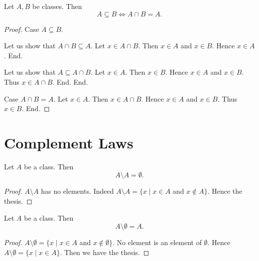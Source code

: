 \documentclass[10pt]{article}
\begin{document}
  \begin{forthel}
    \begin{proposition}
      Let $A, B$ be classes.
      Then \[ A \subseteq B \iff A \cap B = A. \]
    \end{proposition}
    \begin{proof}
      Case $A \subseteq B$.

        Let us show that $A \cap B \subseteq A$.
          Let $x \in A \cap B$.
          Then $x \in A$ and $x \in B$.
          Hence $x \in A$.
        End.

        Let us show that $A \subseteq A \cap B$.
          Let $x \in A$.
          Then $x \in B$.
          Hence $x \in A$ and $x \in B$.
          Thus $x \in A \cap B$.
        End.
      End.

      Case $A \cap B = A$.
        Let $x \in A$.
        Then $x \in A \cap B$.
        Hence $x \in A$ and $x \in B$.
        Thus $x \in B$.
      End.
    \end{proof}
  \end{forthel}


  \section{Complement Laws}

  \begin{forthel}
    \begin{proposition}
      Let $A$ be a class.
      Then \[ A \setminus A = \emptyset. \]
    \end{proposition}
    \begin{proof}
      $A \setminus A$ has no elements.
      Indeed $A \setminus A = \{ x \mid x \in A$ and $x \notin A \}$.
      Hence the thesis.
    \end{proof}
  \end{forthel}

  \begin{forthel}
    \begin{proposition}
      Let $A$ be a class.
      Then \[ A \setminus \emptyset = A. \]
    \end{proposition}
    \begin{proof}
      $A \setminus \emptyset = \{ x \mid x \in A$ and $x \notin \emptyset \}$.
      No element is an element of $\emptyset$.
      Hence $A \setminus \emptyset = \{ x \mid x \in A \}$.
      Then we have the thesis.
    \end{proof}
  \end{forthel}
\end{document}
